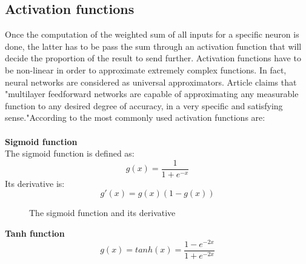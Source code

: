 \subsection{Activation functions}
\label{activation_functions}
Once the computation of the weighted sum of all inputs for a specific neuron is done, the latter has to be pass the sum through an activation function that will decide the proportion of the result to send further. Activation functions have to be non-linear in order to approximate extremely complex functions. In fact, neural networks are considered as universal approximators. Article \cite{17} claims that "multilayer feedforward networks are capable of approximating any measurable function to any desired degree of accuracy, in a very specific and satisfying sense."According to \cite{18} the most commonly used activation functions are:\\\\
 \noindent \textbf{Sigmoid function}\\
 The sigmoid function is defined as:
 \begin{equation}
  g(x) = \frac{1}{1+e^{-x}}
 \end{equation}
 Its derivative is:
 \begin{equation}
 g'(x) = g(x)(1-g(x))
 \end{equation}
 


\begin{figure}[h!]
  \begin{center}
    \caption{The sigmoid function and its derivative}
  \end{center}
\end{figure} 
 
 
 \noindent \textbf{Tanh function}\\
 \begin{equation}
 g(x) = tanh(x) = \frac{1-e^{-2x}}{1+e^{-2x}}
 \end{equation}
  
